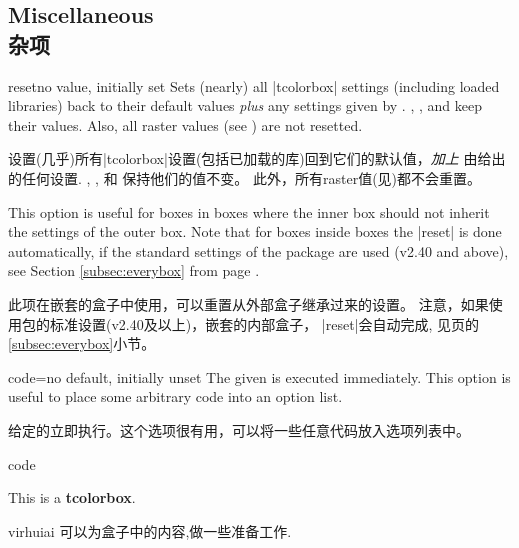 \setcounter{section}{4}
\setcounter{subsection}{23}
\setcounter{subsubsection}{0}

\subsection{Miscellaneous\\杂项}

\begin{docTcbKey}{reset}{}{no value, initially set}
Sets (nearly) all |tcolorbox| settings (including loaded libraries) back to their default values
\emph{plus} any settings given by .
, , and
 keep their values.
Also, all raster values (see ) are not resetted.

设置(几乎)所有|tcolorbox|设置(包括已加载的库)回到它们的默认值，\emph{加上} 由给出的任何设置.%
, , 和  保持他们的值不变。%
此外，所有raster值(见)都不会重置。

This option is useful for boxes in boxes where the inner box should not inherit
the settings of the outer box.
Note that for boxes inside boxes the |reset| is done automatically, if the
standard settings of the package are used (v2.40 and above), see
Section \ref{subsec:everybox} from page \pageref{subsec:everybox}.

此项在嵌套的盒子中使用，可以重置从外部盒子继承过来的设置。%
注意，如果使用包的标准设置(v2.40及以上)，嵌套的内部盒子， |reset|会自动完成, 见\pageref{subsec:everybox}页的\ref{subsec:everybox}小节。
\end{docTcbKey}




\begin{docTcbKey}{code}{=}{no default, initially unset}
The given  is executed immediately. This option is useful
to place some arbitrary code into an option list.

给定的立即执行。这个选项很有用，可以将一些任意代码放入选项列表中。
\begin{exdispExample}{code}

\begin{tcolorbox}[code={\newcommand{\mycommand}{\textit{working}}},
title=My \mycommand\ title]
This is a \textbf{tcolorbox}.
\end{tcolorbox}
\end{exdispExample}

\begin{引述之言}{virhuiai}
可以为盒子中的内容,做一些准备工作.
\end{引述之言}
\end{docTcbKey}



